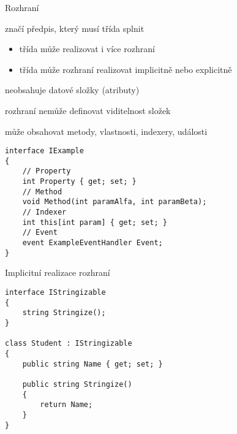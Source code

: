 


\begin{frame}[fragile]
\begin{bitemize}{Rozhraní}
\item značí předpis, který musí třída splnit
\begin{itemize}
\item třída může realizovat i více rozhraní
\item třída může rozhraní realizovat implicitně nebo explicitně
\end{itemize}

\item neobsahuje datové složky (atributy)
\item rozhraní nemůže definovat viditelnost složek
\item může obsahovat metody, vlastnosti, indexery, události
\end{bitemize}

\begin{yesblock}
\begin{lstlisting}[basicstyle=\small]
interface IExample
{
    // Property
    int Property { get; set; }
    // Method
    void Method(int paramAlfa, int paramBeta);
    // Indexer
    int this[int param] { get; set; }
    // Event
    event ExampleEventHandler Event;
}
\end{lstlisting}
\end{yesblock}
\end{frame}




\begin{frame}[fragile]
\begin{block}{}
Implicitní realizace rozhraní
\end{block}
\begin{yesblock}
\begin{lstlisting}[basicstyle=\small]
interface IStringizable
{
    string Stringize();
}

class Student : IStringizable
{
    public string Name { get; set; }

    public string Stringize()
    {
        return Name;
    }
}
\end{lstlisting}
\end{yesblock}
\end{frame}


